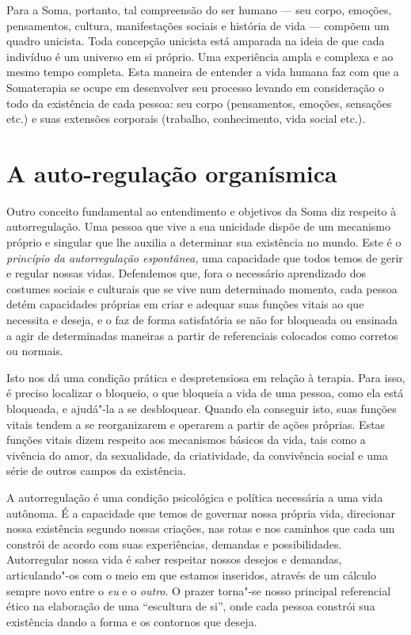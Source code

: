 Para a Soma, portanto, tal compreensão do ser humano --- seu corpo,
emoções, pensamentos, cultura, manifestações sociais e história de vida
--- compõem um quadro unicista. Toda concepção unicista está amparada na
ideia de que cada indivíduo é um universo em si próprio. Uma experiência
ampla e complexa e ao mesmo tempo completa. Esta maneira de entender a
vida humana faz com que a Somaterapia se ocupe em desenvolver seu
processo levando em consideração o todo da existência de cada pessoa:
seu corpo (pensamentos, emoções, sensações etc.) e suas extensões
corporais (trabalho, conhecimento, vida social etc.).

\section{A auto-regulação organísmica}

Outro conceito fundamental ao entendimento e objetivos da Soma diz
respeito à autorregulação. Uma pessoa que vive a sua unicidade dispõe de
um mecanismo próprio e singular que lhe auxilia a determinar sua
existência no mundo. Este é o \emph{princípio da autorregulação
espontânea,} uma capacidade que todos temos de gerir e regular nossas
vidas. Defendemos que, fora o necessário aprendizado dos costumes
sociais e culturais que se vive num determinado momento, cada pessoa
detém capacidades próprias em criar e adequar suas funções vitais ao que
necessita e deseja, e o faz de forma satisfatória se não for
bloqueada ou ensinada a agir de determinadas maneiras a partir de
referenciais colocados como corretos ou normais.

Isto nos dá uma condição prática e despretensiosa em relação à terapia.
Para isso, é preciso localizar o bloqueio, o que bloqueia a vida de uma
pessoa, como ela está bloqueada, e ajudá"-la a se desbloquear. Quando ela
conseguir isto, suas funções vitais tendem a se reorganizarem e operarem
a partir de ações próprias. Estas funções vitais dizem respeito aos
mecanismos básicos da vida, tais como a vivência do amor, da
sexualidade, da criatividade, da convivência social e uma série de
outros campos da existência.

A autorregulação é uma condição psicológica e política necessária a uma
vida autônoma. É a capacidade que temos de governar nossa própria vida,
direcionar nossa existência segundo nossas criações, nas rotas e nos
caminhos que cada um constrói de acordo com suas experiências, demandas
e possibilidades. Autorregular nossa vida é saber respeitar nossos
desejos e demandas, articulando"-os com o meio em que estamos inseridos,
através de um cálculo sempre novo entre o \emph{eu} e o \emph{outro}. O
prazer torna"-se nosso principal referencial ético na elaboração de uma
``escultura de si'', onde cada pessoa constrói sua existência dando a
forma e os contornos que deseja.

